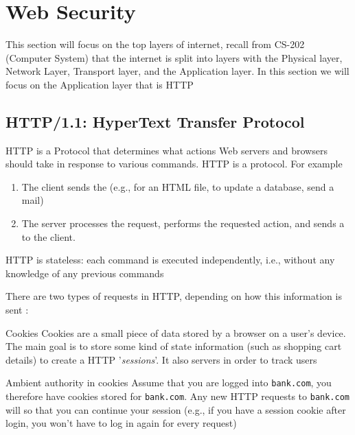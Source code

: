 \section{Web Security}
This section will focus on the top layers of internet, recall from CS-202 (Computer System) that the internet is split into layers with the Physical layer, Network Layer, Transport layer,  and the Application layer. In this section we will focus on the Application layer that is HTTP 

\subsection{HTTP/1.1: HyperText Transfer Protocol}
HTTP is a Protocol that determines what actions Web servers and browsers should take in response to various commands. HTTP is a  protocol. For example

\begin{enumerate}
    \item The client sends the  (e.g., for an HTML file, to update a database, send a mail)
    \item The server processes the request, performs the requested action, and sends a  to the client.
\end{enumerate}
\begin{center}
    HTTP is stateless: each command is executed independently, i.e., without any knowledge of any previous commands
\end{center}
There are two types of requests in HTTP, depending on how this information is sent :
\begin{parag}{Cookies}
    Cookies are a small piece of data stored by a browser on a user's device. The main goal is to store some kind of state information (such as shopping cart details) to create a HTTP '\textit{sessions}'. It also servers in order to track users
	\begin{subparag}{Ambient authority in cookies}
	    Assume that you are logged into \texttt{bank.com}, you therefore have cookies stored for \texttt{bank.com}. Any new HTTP requests to \texttt{bank.com} will  so that you can continue your session (e.g., if you have a session cookie after login, you won't have to log in again for every request)
	\end{subparag}
\end{parag}

